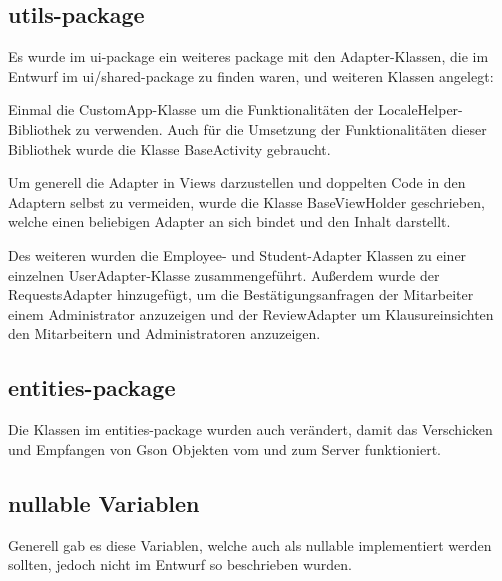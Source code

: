     \newpage

    \subsection{utils-package}

        Es wurde im ui-package ein weiteres package mit den Adapter-Klassen, die im Entwurf im ui/shared-package zu finden waren, und weiteren Klassen angelegt:

        Einmal die CustomApp-Klasse um die Funktionalitäten der LocaleHelper-Bibliothek zu verwenden.
        Auch für die Umsetzung der Funktionalitäten dieser Bibliothek wurde die Klasse BaseActivity gebraucht.

        Um generell die Adapter in Views darzustellen und doppelten Code in den Adaptern selbst zu vermeiden, wurde die Klasse BaseViewHolder geschrieben, welche einen beliebigen Adapter an sich bindet und den Inhalt darstellt.

        Des weiteren wurden die Employee- und Student-Adapter Klassen zu einer einzelnen UserAdapter-Klasse zusammengeführt.
        Außerdem wurde der RequestsAdapter hinzugefügt, um die Bestätigungsanfragen der Mitarbeiter einem Administrator anzuzeigen und der ReviewAdapter um Klausureinsichten den Mitarbeitern und Administratoren anzuzeigen.

    \subsection{entities-package}

        Die Klassen im entities-package wurden auch verändert, damit das Verschicken und Empfangen von Gson Objekten vom und zum Server funktioniert.

    \subsection{nullable Variablen}

        Generell gab es diese Variablen, welche auch als nullable implementiert werden sollten, jedoch nicht im Entwurf so beschrieben wurden.
